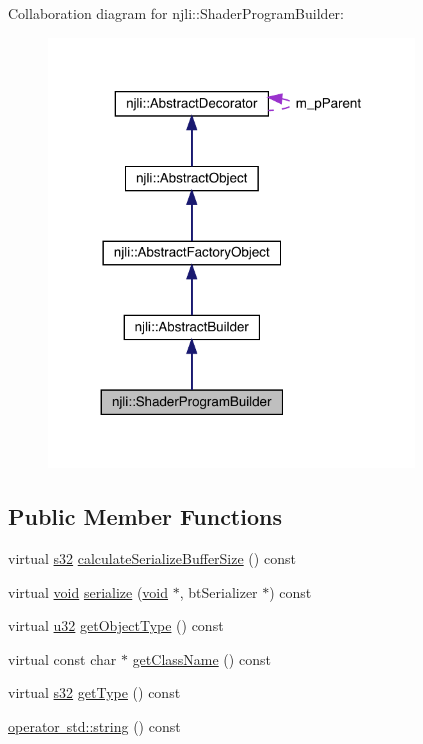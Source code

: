 Collaboration diagram for njli\+:\+:Shader\+Program\+Builder\+:\nopagebreak
\begin{figure}[H]
\begin{center}
\leavevmode
\includegraphics[width=275pt]{classnjli_1_1_shader_program_builder__coll__graph}
\end{center}
\end{figure}
\subsection*{Public Member Functions}
\begin{DoxyCompactItemize}
\item 
virtual \mbox{\hyperlink{_util_8h_aa62c75d314a0d1f37f79c4b73b2292e2}{s32}} \mbox{\hyperlink{classnjli_1_1_shader_program_builder_a9dc26dce669964afdddd7ccf44ce3210}{calculate\+Serialize\+Buffer\+Size}} () const
\item 
virtual \mbox{\hyperlink{_thread_8h_af1e856da2e658414cb2456cb6f7ebc66}{void}} \mbox{\hyperlink{classnjli_1_1_shader_program_builder_ae22417a6b93438971835bdf638fcebb8}{serialize}} (\mbox{\hyperlink{_thread_8h_af1e856da2e658414cb2456cb6f7ebc66}{void}} $\ast$, bt\+Serializer $\ast$) const
\item 
virtual \mbox{\hyperlink{_util_8h_a10e94b422ef0c20dcdec20d31a1f5049}{u32}} \mbox{\hyperlink{classnjli_1_1_shader_program_builder_a12234652d43de942922cec53b69956b3}{get\+Object\+Type}} () const
\item 
virtual const char $\ast$ \mbox{\hyperlink{classnjli_1_1_shader_program_builder_a131e91d141b0223cedebc6171de59b9b}{get\+Class\+Name}} () const
\item 
virtual \mbox{\hyperlink{_util_8h_aa62c75d314a0d1f37f79c4b73b2292e2}{s32}} \mbox{\hyperlink{classnjli_1_1_shader_program_builder_a252394f97f129b953718c0b2713005e2}{get\+Type}} () const
\item 
\mbox{\hyperlink{classnjli_1_1_shader_program_builder_a84e2ca7ff8a9b890ddab11ce9feb07bb}{operator std\+::string}} () const
\end{DoxyCompactItemize}
